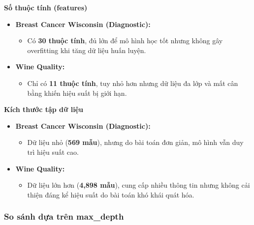 \textbf{Số thuộc tính (features)}
\begin{itemize}
	\item \textbf{Breast Cancer Wisconsin (Diagnostic):}
	\begin{itemize}
		\item Có \textbf{30 thuộc tính}, đủ lớn để mô hình học tốt nhưng không gây overfitting khi tăng dữ liệu huấn luyện.
	\end{itemize}
	\item \textbf{Wine Quality:}
	\begin{itemize}
		\item Chỉ có \textbf{11 thuộc tính}, tuy nhỏ hơn nhưng dữ liệu đa lớp và mất cân bằng khiến hiệu suất bị giới hạn.
	\end{itemize}
\end{itemize}

\newpage
\textbf{Kích thước tập dữ liệu}
\begin{itemize}
	\item \textbf{Breast Cancer Wisconsin (Diagnostic):}
	\begin{itemize}
		\item Dữ liệu nhỏ (\textbf{569 mẫu}), nhưng do bài toán đơn giản, mô hình vẫn duy trì hiệu suất cao.
	\end{itemize}
	\item \textbf{Wine Quality:}
	\begin{itemize}
		\item Dữ liệu lớn hơn (\textbf{4,898 mẫu}), cung cấp nhiều thông tin nhưng không cải thiện đáng kể hiệu suất do bài toán khó khái quát hóa.
	\end{itemize}
\end{itemize}


\subsubsection{So sánh dựa trên max\_depth}


